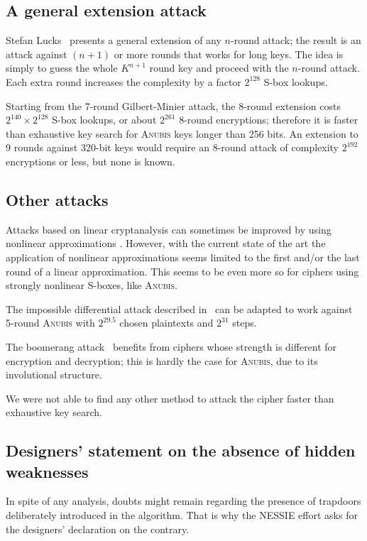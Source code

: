 \documentclass{llncs}
\begin{document}
\subsection{A general extension attack}

Stefan Lucks~\cite{lucks} presents a general extension of any
$n$-round attack; the result is an attack against $(n+1)$ or more
rounds that works for long keys. The idea is simply to guess the
whole $K^{n+1}$ round key and proceed with the $n$-round attack.
Each extra round increases the complexity by a factor $2^{128}$
S-box lookups.

Starting from the 7-round Gilbert-Minier attack, the 8-round
extension costs $2^{140} \times 2^{128}$ S-box lookups, or about
$2^{261}$ 8-round encryptions; therefore it is faster than
exhaustive key search for \textsc{Anubis} keys longer than 256
bits. An extension to 9 rounds against 320-bit keys would require
an 8-round attack of complexity $2^{192}$ encryptions or less, but
none is known.

\subsection{Other attacks}

Attacks based on linear cryptanalysis can sometimes be improved
by using nonlinear approximations \cite{nonl}. However, with the current
state of the art the application of nonlinear approximations seems limited
to the first and/or the last round of a linear approximation. This seems
to be even more so
for ciphers using strongly nonlinear S-boxes, like \textsc{Anubis}.

The impossible differential attack described
in~\cite{biham-keller} can be adapted to work against 5-round
\textsc{Anubis} with $2^{29.5}$ chosen plaintexts and $2^{31}$
steps.

The boomerang attack~\cite{boomerang} benefits from ciphers whose
strength is different for encryption and decryption; this is
hardly the case for \textsc{Anubis}, due to its involutional
structure.

We were not able to find any other method to attack the cipher
faster than exhaustive key search.

\subsection{Designers' statement on the absence of hidden
weaknesses}\label{no-hidden-weakness}

In spite of any analysis, doubts might remain regarding the
presence of trapdoors deliberately introduced in the algorithm.
That is why the NESSIE effort asks for the designers' declaration
on the contrary.
\end{document}
